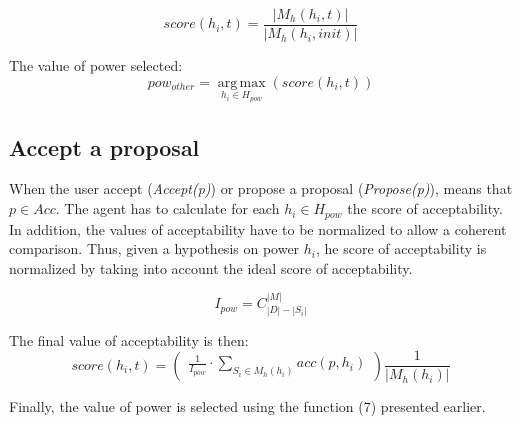 \documentclass{llncs}
\begin{document}
				$$score(h_i,t) = \frac{|M_h(h_i, t)|}{|M_h(h_i, init)|}$$
			
			The value of power selected:
			\begin{equation}
				pow_{other} = \operatorname*{arg\,max}_{h_i \in H_{pow}} ( score(h_i,t))
			\end{equation}
			
		\subsection{Accept a proposal}
				When the user accept (\emph{Accept(p)}) or propose a proposal (\emph{Propose(p)}), means that $p \in Acc$. 
				The agent has to calculate for each $h_i \in H_{pow}$ the score of acceptability. In addition, the values of acceptability have to be normalized to allow a coherent comparison. Thus, given a hypothesis on power $h_i$, he score of acceptability is normalized by taking into account the ideal score of acceptability.

				$$I_{pow} =  C_{|D|-|S_i|}^{|M|}$$

				
				The final value of acceptability is then:
				\begin{equation}
					score(h_i, t)= \left( \begin{array}{c}  \frac{1}{I_{pow}} \cdot \sum_{S_i \in M_h(h_i) } acc(p, h_i) 
					\end{array}\right) \frac{1}{| M_h(h_i)|}
				\end{equation}
				
				Finally, the value of power is selected using the function (7) presented earlier.

			
\end{document}
